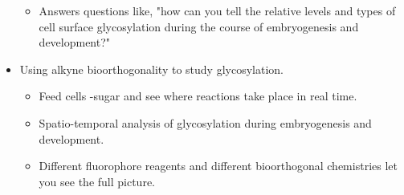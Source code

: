 \documentclass[../notes.tex]{subfiles}
\begin{document}
\begin{itemize}
    \begin{itemize}
        \item Answers questions like, "how can you tell the relative levels and types of cell surface glycosylation during the course of embryogenesis and development?"
    \end{itemize}
    \item Using alkyne bioorthogonality to study glycosylation.
    \begin{itemize}
        \item Feed cells -sugar and see where reactions take place in real time.
        \item Spatio-temporal analysis of glycosylation during embryogenesis and development.
        \item Different fluorophore reagents and different bioorthogonal chemistries let you see the full picture.
    \end{itemize}
\end{itemize}
\end{document}

